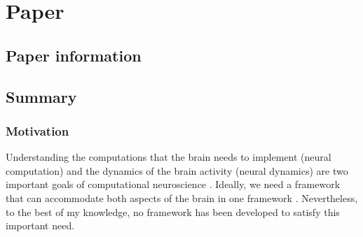 \chapter{Paper }\label{cha:paper-safavi2020cribay}
\section*{Paper information} %



\section*{Summary} %
\subsection*{Motivation}

Understanding the computations that the brain needs to implement (neural computation)
and the dynamics of the brain activity (neural dynamics) are two important goals of computational neuroscience \cite[Chapter 1]{churchlandComputationalBrain1992}.
Ideally, we need a framework that can accommodate both aspects of the brain in one framework
\cite{churchlandComputationalBrain1992,eurichNeuralDynamicsNeural2003}.
Nevertheless, to the best of my knowledge, no framework has been developed to satisfy this important need.


